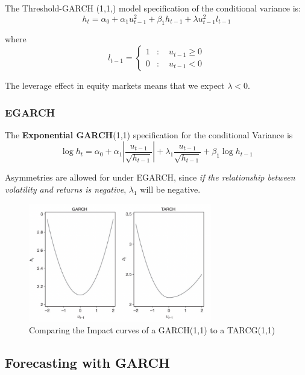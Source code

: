 \documentclass[11pt]{article}
\begin{document}
 The Threshold-GARCH (1,1,) model specification of the conditional variance is:
 \begin{equation}
 \label{TGARCGH}
h_t=\alpha_0+\alpha_1 u_{t-1}^2+\beta_1 h_{t-1}+\lambda u_{t-1}^2 l_{t-1}
\end{equation}

where
\begin{equation}
l_{t-1}= \begin{cases}1 & : \quad u_{t-1} \geq 0 \\
0 &: \quad u_{t-1}<0\end{cases}
\end{equation}

The leverage effect in equity markets means that we expect $\lambda<0$.

 \subsubsection{EGARCH}

 The \textbf{Exponential GARCH}(1,1) specification for the conditional Variance is
 \begin{equation}
 \label{EGARCH}
\log h_t=\alpha_0+\alpha_1\left|\frac{u_{t-1}}{\sqrt{h_{t-1}}}\right|+\lambda_1 \frac{u_{t-1}}{\sqrt{h_{t-1}}}+\beta_1 \log h_{t-1}
\end{equation}


Asymmetries are allowed for under EGARCH, since \textit{if the relationship between volatility and returns is negative}, $\lambda_1$ will be negative.

\begin{figure}[h]
    \centering
    \includegraphics[width=8cm]{pics/GARCH TARCH.png}
    \caption{Comparing the Impact curves of a GARCH(1,1) to a TARCG(1,1)}
    \label{fig:GARCH TARCH}
\end{figure}

 \subsection{Forecasting with GARCH}
\end{document}
